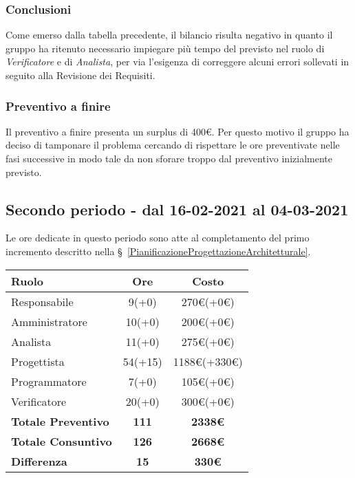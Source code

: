 {{{\subsubsection{Conclusioni}
Come emerso dalla tabella precedente, il bilancio risulta negativo in quanto il gruppo ha ritenuto necessario impiegare più tempo del previsto nel ruolo di \textit{Verificatore} e di \textit{Analista}, per via l'esigenza di correggere alcuni errori sollevati in seguito alla Revisione dei Requisiti. 

\subsubsection{Preventivo a finire}
Il preventivo a finire presenta un surplus di 400\euro. Per questo motivo il gruppo ha deciso di tamponare il problema cercando di rispettare le ore preventivate nelle fasi successive in modo tale da non sforare troppo dal preventivo inizialmente previsto.

\subsection{Secondo periodo - dal 16-02-2021 al 04-03-2021 }\label{ConsuntivoPeriodoDiProgettazioneArchitetturaleTechnologyBaselinePrimoIncremento}

Le ore dedicate in questo periodo sono atte al completamento del primo incremento descritto nella  \S~\ref{PianificazioneProgettazioneArchitetturale}.

\quad
\def\tabularxcolumn#1{m{#1}}
{
	\begin{center}
		\renewcommand{\arraystretch}{1.4}
		\begin{tabularx}{10cm}{|X|c|c|}
			\hline
			\rowcolor{airforceblue}
			\textbf{Ruolo} & \textbf{Ore} & \textbf{Costo}\\
			\hline
			Responsabile & 9(+0) & 270\euro(+0\euro)\\
			\hline
			Amministratore & 10(+0) & 200\euro(+0\euro)\\
			\hline
			Analista & 11(+0) & 275\euro(+0\euro)\\
			\hline
			Progettista & 54(+15) & 1188\euro(+330\euro)\\
			\hline
			Programmatore & 7(+0) & 105\euro(+0\euro)\\
			\hline
			Verificatore & 20(+0) & 300\euro(+0\euro)\\
			\hline
			\textbf{Totale Preventivo} & \textbf{111} & \textbf{2338\euro}\\
			\hline
			\textbf{Totale Consuntivo} & \textbf{126} & \textbf{2668\euro}\\
			\hline
			\textbf{Differenza} & \textbf{15} & \textbf{330\euro}
		\end{tabularx}
	\end{center}

}}}}
